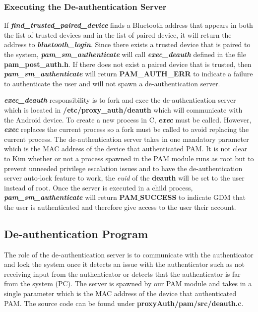 \documentclass[letterpaper,twocolumn,10pt]{article}
\begin{document}
\subsubsection{Executing the De-authentication Server}
If \textbf{\emph{find\_trusted\_paired\_device}} finds a Bluetooth address that appears in both the list of trusted devices and in the list of paired device, it will return the address to \textbf{\emph{bluetooth\_login}}. Since there exists a trusted device that is paired to the system, \textbf{\emph{pam\_sm\_authenticate}} will call \textbf{\emph{exec\_deauth}} defined in the file \textbf{pam\_post\_auth.h}. If there does not exist a paired device that is trusted, then \textbf{\emph{pam\_sm\_authenticate}} will return \textbf{PAM\_AUTH\_ERR} to indicate a failure to authenticate the user and will not spawn a de-authentication server.

\textbf{\emph{exec\_deauth}} responsibility is to fork and exec the de-authentication server which is located in \textbf{/etc/proxy\_auth/deauth} which will communicate with the Android device. To create a new process in C, \textbf{\emph{exec}} must be called. However, \textbf{\emph{exec}} replaces the current process so a fork must be called to avoid replacing the current process. The de-authentication server takes in one mandatory parameter which is the MAC address of the device that authenticated PAM. It is not clear to Kim whether or not a process spawned in the PAM module runs as root but to prevent unneeded privilege escalation issues and to have the de-authentication server auto-lock feature to work, the \emph{euid} of the \textbf{deauth} will be set to the user instead of root. Once the server is executed in a child process, \textbf{\emph{pam\_sm\_authenticate}} will return \textbf{PAM$\_$SUCCESS} to indicate GDM that the user is authenticated and therefore give access to the user their account.

\subsection{De-authentication Program}
The role of the de-authentication server is to communicate with the authenticator and lock the system once it detects an issue with the authenticator such as not receiving input from the authenticator or detects that the authenticator is far from the system (PC). The server is spawned by our PAM module and takes in a single parameter which is the MAC address of the device that authenticated PAM. The source code can be found under \textbf{proxyAuth/pam/src/deauth.c}. 
\end{document}
